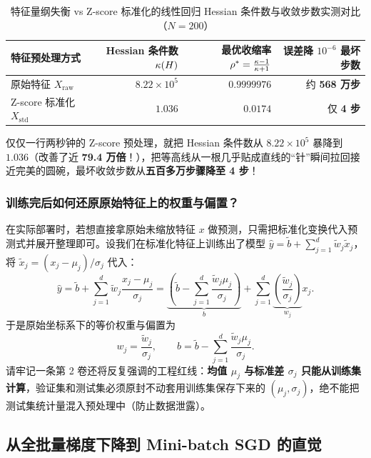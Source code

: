 \begin{table}[htbp]
\centering
\caption{特征量纲失衡 vs Z-score 标准化的线性回归 Hessian 条件数与收敛步数实测对比（$N=200$）}
\label{tab:ch6-scaling}
\small
\begin{tabular}{@{}lrrr@{}}
\toprule
\textbf{特征预处理方式} & \textbf{Hessian 条件数 $\kappa(H)$} & \textbf{最优收缩率 $\rho^* = \frac{\kappa-1}{\kappa+1}$} & \textbf{误差降 $10^{-6}$ 最坏步数} \\
\midrule
原始特征 $X_{\text{raw}}$ & $8.22 \times 10^{5}$ & $0.9999976$ & 约 \textbf{568 万步} \\
Z-score 标准化 $X_{\text{std}}$ & $\mathbf{1.036}$ & $\mathbf{0.0174}$ & 仅 \textbf{4 步} \\
\bottomrule
\end{tabular}
\end{table}

仅仅一行两秒钟的 Z-score 预处理，就把 Hessian 条件数从 \textbf{$8.22\times 10^5$} 暴降到 \textbf{$1.036$}（改善了近 \textbf{79.4 万倍}！），把等高线从一根几乎贴成直线的“针”瞬间拉回接近完美的圆碗，最坏收敛步数从\textbf{五百多万步骤降至 4 步}！

\subsubsection{训练完后如何还原原始特征上的权重与偏置？}
在实际部署时，若想直接拿原始未缩放特征 $x$ 做预测，只需把标准化变换代入预测式并展开整理即可。设我们在标准化特征上训练出了模型 $\hat{y} = \tilde{b} + \sum_{j=1}^d \tilde{w}_j \tilde{x}_j$，将 $\tilde{x}_j = (x_j - \mu_j)/\sigma_j$ 代入：
\[
  \hat{y} = \tilde{b} + \sum_{j=1}^d \tilde{w}_j \frac{x_j - \mu_j}{\sigma_j}
          = \underbrace{\left(\tilde{b} - \sum_{j=1}^d \frac{\tilde{w}_j \mu_j}{\sigma_j}\right)}_{b}
            + \sum_{j=1}^d \underbrace{\left(\frac{\tilde{w}_j}{\sigma_j}\right)}_{w_j} x_j.
\]
于是原始坐标系下的等价权重与偏置为
\begin{equation}\label{eq:ch6-recover-w}
  w_j = \frac{\tilde{w}_j}{\sigma_j},
  \qquad
  b = \tilde{b} - \sum_{j=1}^d \frac{\tilde{w}_j \mu_j}{\sigma_j}.
\end{equation}
请牢记一条第 2 卷还将反复强调的工程红线：\textbf{均值 $\mu_j$ 与标准差 $\sigma_j$ 只能从训练集计算}，验证集和测试集必须原封不动套用训练集保存下来的 $(\mu_j, \sigma_j)$，绝不能把测试集统计量混入预处理中（防止数据泄露）。

\subsection{从全批量梯度下降到 Mini-batch SGD 的直觉}

